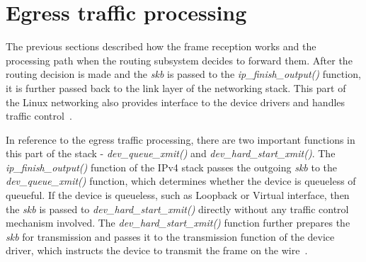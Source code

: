 
\section{Egress traffic processing}\label{sec:linux-egress}
The previous sections described how the frame reception works and the processing path
when the routing subsystem decides to forward them.
After the routing decision is made and the {\it{skb}} is passed to the {\it{ip\_finish\_output()}} function,
it is further passed back to the link layer of the networking stack.
This part of the Linux networking also provides interface to the device drivers
and handles traffic control~\cite{understanding-internals}.

In reference to the egress traffic processing, there are two important functions in this part of the stack -
{\it{dev\_queue\_xmit()}} and {\it{dev\_hard\_start\_xmit()}}.
The {\it{ip\_finish\_output()}} function of the IPv4 stack passes the outgoing {\it{skb}}
to the {\it{dev\_queue\_xmit()}} function, which determines
whether the device is queueless of queueful.
If the device is queueless, such as Loopback or Virtual interface, then the {\it{skb}} is passed to
{\it{dev\_hard\_start\_xmit()}} directly without any traffic control mechanism involved.
The {\it{dev\_hard\_start\_xmit()}} function further prepares the {\it{skb}} for transmission
and passes it to the transmission function of the device driver,
which instructs the device to transmit the frame on the wire~\cite{understanding-internals}.

